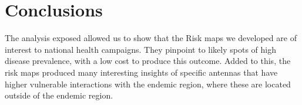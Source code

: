 





\chapter{Conclusions}\label{ch:conclusions}


The analysis exposed allowed us to show that the Risk maps we developed are of interest to national health campaigns.
They pinpoint to likely spots of high disease prevalence, with a low cost to produce this outcome.
Added to this, the risk maps produced many interesting insights of specific antennas that have higher vulnerable interactions with the endemic region, where these are located outside of the endemic region.


